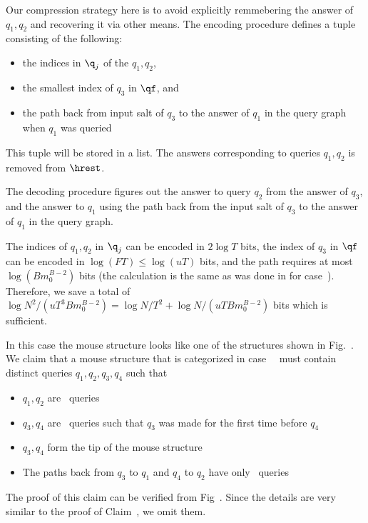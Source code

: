 {Our compression strategy here is to avoid explicitly remmebering the answer of $q_1,q_2$ and recovering it via other means. The encoding procedure defines a tuple consisting of the following:
\begin{itemize}
\item the indices in $\q_j$ of the $q_1,q_2$,
\item the smallest index of $q_3$ in $\qf$, and
\item the path back from input salt of $q_3$ to the answer of $q_1$ in the query graph when $q_1$ was queried
\end{itemize}
This tuple will be stored in a list. The answers corresponding to queries $q_1,q_2$ is removed from $\hrest$.

The decoding procedure figures out the answer to query $q_2$ from the answer of $q_3$, and the answer to $q_1$ using the path back from the input salt of $q_3$ to the answer of $q_1$ in the query graph.
\unfammousefig


The indices of $q_1,q_2$ in $\q_j$ can be encoded in $2\log T$ bits, the index of $q_3$ in $\qf$ can be encoded in $\log (FT)\leq \log (uT)$ bits, and the path requires at most $\log (Bm_0^{B-2})$ bits (the calculation is the same as was done in  for case~). Therefore, we save a total of $\log N^2/(uT^3Bm_0^{B-2})=\log N/T^2+\log N/(uTBm_0^{B-2})$ bits which is sufficient.


In this case the mouse structure looks like one of the structures shown in Fig.~. We claim that a mouse structure that is categorized in case~~ must contain distinct queries $q_1,q_2,q_3,q_4$  such that
\begin{itemize}
\item $q_1,q_2$ are \new\ queries
\item $q_3,q_4$ are \urep\ queries such that $q_3$ was made for the first time before $q_4$
\item $q_3,q_4$ form the tip of the mouse structure
\item The paths back from $q_3$ to $q_1$ and $q_4$ to $q_2$ have only \urep\ queries
\end{itemize}
The proof of this claim can be verified from Fig~. Since the details are very similar to the proof of Claim~, we omit them.

}
